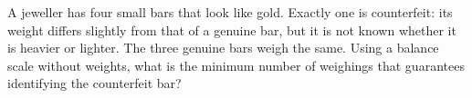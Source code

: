 A jeweller has four small bars that look like gold. Exactly one is counterfeit: its weight differs slightly from that of a genuine bar, but it is not known whether it is heavier or lighter. The three genuine bars weigh the same. Using a balance scale without weights, what is the minimum number of weighings that guarantees identifying the counterfeit bar?
